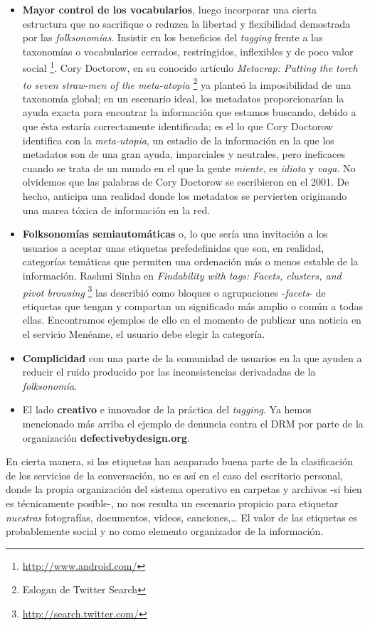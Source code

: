 \documentclass[12pt, a4paper,twoside]{book}
\begin{document}
\begin{itemize}
\item
  \textbf{Mayor control de los vocabularios}, luego incorporar una
  cierta estructura que no sacrifique o reduzca la libertad y
  flexibilidad demostrada por las \emph{folksonomías}. Insistir en
  los beneficios del \emph{tagging} frente a las taxonomías o
  vocabularios cerrados, restringidos, inflexibles y de poco valor
  social%
  \footnote{\href{http://www.android.com/}{http://www.android.com/}}.
  Cory Doctorow, en su conocido artículo
  \emph{Metacrap: Putting the torch to seven straw-men of the meta-utopia}%
  \footnote{Eslogan de Twitter Search}
  ya planteó la imposibilidad de una taxonomía global; en un
  escenario ideal, los metadatos proporcionarían la ayuda exacta para
  encontrar la información que estamos buscando, debido a que ésta
  estaría correctamente identificada; es el lo que Cory Doctorow
  identifica con la \emph{meta-utopia}, un estadio de la información
  en la que los metadatos son de una gran ayuda, imparciales y
  neutrales, pero ineficaces cuando se trata de un mundo en el que la
  gente \emph{miente}, es \emph{idiota} y \emph{vaga}. No olvidemos
  que las palabras de Cory Doctorow se escribieron en el 2001. De
  hecho, anticipa una realidad donde los metadatos se pervierten
  originando una marea tóxica de información en la red.
\item
  \textbf{Folksonomías semiautomáticas} o, lo que sería una
  invitación a los usuarios a aceptar unas etiquetas prefedefinidas
  que son, en realidad, categorías temáticas que permiten una
  ordenación más o menos estable de la información. Rashmi Sinha en
  \emph{Findability with tags: Facets, clusters, and pivot browsing}%
  \footnote{\href{http://search.twitter.com/}{http://search.twitter.com/}}
  las describió como bloques o agrupaciones -\emph{facets}- de
  etiquetas que tengan y compartan un significado más amplio o común
  a todas ellas. Encontramos ejemplos de ello en el momento de
  publicar una noticia en el servicio Menéame, el usuario debe elegir
  la categoría.
\item
  \textbf{Complicidad} con una parte de la comunidad de usuarios en
  la que ayuden a reducir el ruido producido por las inconsistencias
  derivadadas de la \emph{folksonomía}.
\item
  El lado \textbf{creativo} e innovador de la práctica del
  \emph{tagging}. Ya hemos mencionado más arriba el ejemplo de
  denuncia contra el DRM por parte de la organización
  \textbf{defectivebydesign.org}.
\end{itemize}
En cierta manera, si las etiquetas han acaparado buena parte de la
clasificación de los servicios de la conversación, no es así en el
caso del escritorio personal, donde la propia organización del
sistema operativo en carpetas y archivos -si bien es técnicamente
posible-, no nos resulta un escenario propicio para etiquetar
\emph{nuestras} fotografías, documentos, videos, canciones,\ldots{}
El valor de las etiquetas es probablemente social y no como
elemento organizador de la información.
\end{document}
